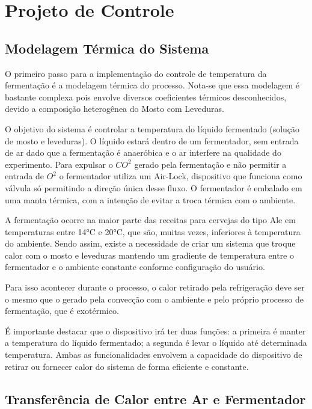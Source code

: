 \section{Projeto de Controle}

\subsection{Modelagem Térmica do Sistema}

O primeiro passo para a implementação do controle de temperatura da fermentação é a modelagem térmica do processo. Nota-se que essa modelagem é bastante complexa pois envolve diversos coeficientes térmicos desconhecidos, devido a composição heterogênea do Mosto com Leveduras. 

O objetivo do sistema é controlar a temperatura do líquido fermentado (solução de mosto e leveduras). O líquido estará dentro de um fermentador, sem entrada de ar dado que a fermentação é anaeróbica e o ar interfere na qualidade do experimento. Para expulsar o $CO^2$ gerado pela fermentação e não permitir a entrada de $O^2$ o fermentador utiliza um Air-Lock, dispositivo que funciona como válvula só permitindo a direção única desse fluxo. O fermentador é embalado em uma manta térmica, com a intenção de evitar a troca térmica com o ambiente.

A fermentação ocorre na maior parte das receitas para cervejas do tipo Ale em temperaturas entre 14°C e 20°C, que são, muitas vezes, inferiores à temperatura do ambiente. Sendo assim, existe a necessidade de criar um sistema que troque calor com o mosto e leveduras mantendo um gradiente de temperatura entre o fermentador e o ambiente constante conforme configuração do usuário. 

Para isso acontecer durante o processo, o calor retirado pela refrigeração deve ser o mesmo que o gerado pela convecção com o ambiente e pelo próprio processo de fermentação, que é exotérmico. 


É importante destacar que o dispositivo irá ter duas funções: a primeira é manter a temperatura do líquido fermentado; a segunda é levar o líquido até determinada temperatura. Ambas as funcionalidades envolvem a capacidade do dispositivo de retirar ou fornecer calor do sistema de forma eficiente e constante. 


\subsection{Transferência de Calor entre Ar e Fermentador}

